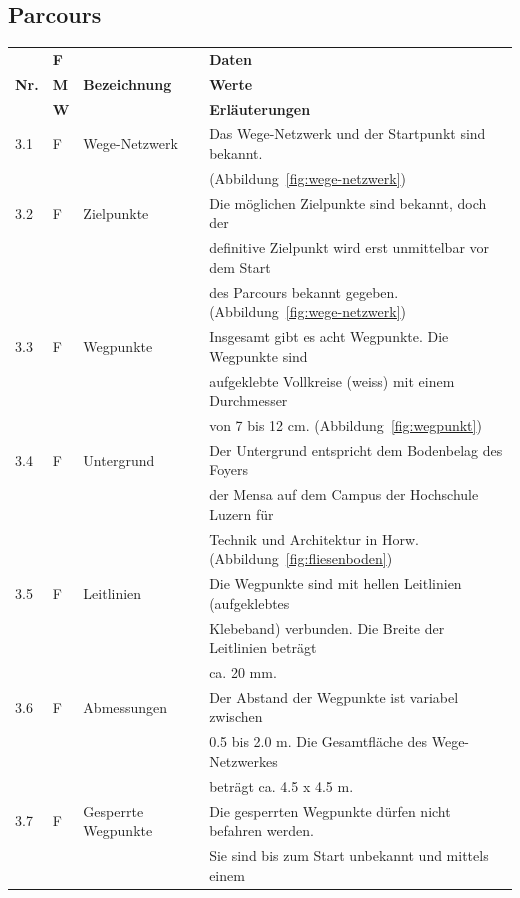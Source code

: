 \documentclass[../main.tex]{subfiles}
\begin{document}
\subsection{Parcours}
\begin{tabular}{|l|l|l|l|}
  \hline
  & \textbf{F} & & \textbf{Daten} \\
  \textbf{Nr.} & \textbf{M} & \textbf{Bezeichnung} & \textbf{Werte} \\
  & \textbf{W} & & \textbf{Erläuterungen} \\
  \hline
  3.1 & F & Wege-Netzwerk & Das Wege-Netzwerk und der Startpunkt sind
  bekannt. \\
  & & & (Abbildung~\ref{fig:wege-netzwerk}) \\
  \hline
  3.2 & F & Zielpunkte & Die möglichen Zielpunkte sind bekannt, doch der \\
  & & & definitive Zielpunkt wird erst unmittelbar vor dem Start \\
  & & & des Parcours bekannt gegeben. (Abbildung~\ref{fig:wege-netzwerk}) \\
  \hline
  3.3 & F & Wegpunkte & Insgesamt gibt es acht Wegpunkte. Die Wegpunkte sind \\
  & & & aufgeklebte Vollkreise (weiss) mit einem Durchmesser \\
  & & & von 7 bis 12 cm. (Abbildung~\ref{fig:wegpunkt}) \\
  \hline
  3.4 & F & Untergrund & Der Untergrund entspricht dem Bodenbelag des Foyers \\
  & & & der Mensa auf dem Campus der Hochschule Luzern für \\
  & & & Technik und Architektur in Horw. (Abbildung~\ref{fig:fliesenboden}) \\
  \hline
  3.5 & F & Leitlinien & Die Wegpunkte sind mit hellen Leitlinien
  (aufgeklebtes \\
  & & & Klebeband) verbunden. Die Breite der Leitlinien beträgt \\
  & & & ca. 20 mm. \\
  \hline
  3.6 & F & Abmessungen & Der Abstand der Wegpunkte ist variabel zwischen \\
  & & & 0.5 bis 2.0 m. Die Gesamtfläche des Wege-Netzwerkes \\
  & & & beträgt ca. 4.5 x 4.5 m. \\
  \hline
  3.7 & F &  Gesperrte Wegpunkte & Die gesperrten Wegpunkte dürfen
  nicht befahren werden. \\
  & & & Sie sind bis zum Start unbekannt und mittels einem \\

\end{tabular}
\end{document}
